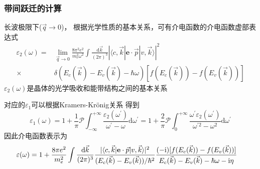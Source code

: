 \documentclass[cjk,slidestop,compress,mathserif,blue]{beamer}
\begin{document}
\frame
{
	\frametitle{带间跃迁的计算}
长波极限下($\vec q\rightarrow0$)， 根据光学性质的基本关系，可有介电函数的介电函数虚部表达式
\begin{displaymath}
	\begin{aligned}
		\varepsilon_2(\omega)=&\lim_{\vec q\rightarrow0}\frac{8\pi^2e^2}{m_e^2\omega^2}\int\frac{\mathrm{d}\vec k}{(2\pi)^3}|\langle c,\vec k|\mathbf{e}\cdot\vec p|v,\vec k\rangle|^2\\
		\times&\delta(E_c(\vec k)-E_v(\vec k)-\hbar\omega)[f(E_c(\vec k))-f(E_v(\vec k))]
	\end{aligned}
  \label{eq:optic-varepsilon_2}
\end{displaymath}
$\varepsilon_2(\omega)$是晶体的光学吸收和能带结构之间的基本关系

对应的$\varepsilon_1$可以根据\textrm{Kramers-Kr\"onig}关系%
得到
\begin{displaymath}
	\varepsilon_1(\omega)=1+\frac1{\pi}\mathscr{P}\int_{-\infty}^{+\infty}\frac{\varepsilon_2(\omega^{\prime})}{\omega^{\prime}-\omega}\textrm{d}\omega^{\prime}=1+\frac2{\pi}\mathscr{P}\int_0^{+\infty}\frac{\omega^{\prime}\varepsilon_2(\omega^{\prime})}{\omega^{\prime2}-\omega^2}\textrm{d}\omega^{\prime}
  \label{eq:optic-varepsilon_1}
\end{displaymath}
因此介电函数表示为
\begin{displaymath}
	\hspace*{-10pt}
	\varepsilon(\omega)=1+\frac{8\pi e^2}{m_e^2}\int\frac{\mathrm{d}\vec k}{(2\pi)^3}\frac{|\langle c,\vec k|\mathbf{e}\cdot\vec p|v,\vec k\rangle|^2}{(E_c(\vec k)-E_v(\vec k))/\hbar^2}\frac{(-\mathrm{i})[f(E_c(\vec k))-f(E_v(\vec k))]}{E_c(\vec k)-E_v(\vec k)-\hbar\omega-\mathrm{i}\eta}
  \label{eq:optic-varepsilon}
\end{displaymath}
}
\end{document}
